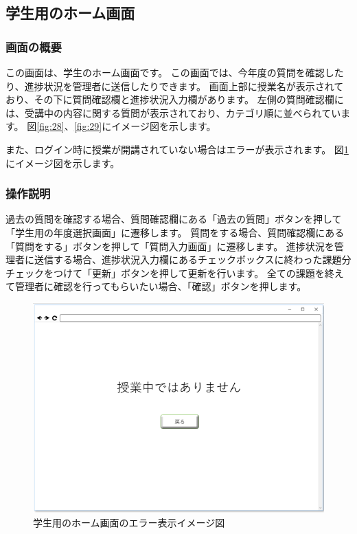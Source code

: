 \newpage
\subsection{学生用のホーム画面}
\subsubsection{画面の概要}
この画面は、学生のホーム画面です。
この画面では、今年度の質問を確認したり、進捗状況を管理者に送信したりできます。
画面上部に授業名が表示されており、その下に質問確認欄と進捗状況入力欄があります。
左側の質問確認欄には、受講中の内容に関する質問が表示されており、カテゴリ順に並べられています。
図\ref{fig:28}、\ref{fig:29}にイメージ図を示します。

また、ログイン時に授業が開講されていない場合はエラーが表示されます。
図\ref{fig:00}にイメージ図を示します。

\subsubsection{操作説明}
過去の質問を確認する場合、質問確認欄にある「過去の質問」ボタンを押して「学生用の年度選択画面」に遷移します。
質問をする場合、質問確認欄にある「質問をする」ボタンを押して「質問入力画面」に遷移します。
進捗状況を管理者に送信する場合、進捗状況入力欄にあるチェックボックスに終わった課題分チェックをつけて「更新」ボタンを押して更新を行います。
全ての課題を終えて管理者に確認を行ってもらいたい場合、「確認」ボタンを押します。

\begin{figure}[htbp]
  \begin{center}
    \includegraphics[width=0.8\linewidth,clip]{./img/00.png}
    \caption{学生用のホーム画面のエラー表示イメージ図}\label{fig:00}
  \end{center}
\end{figure}

